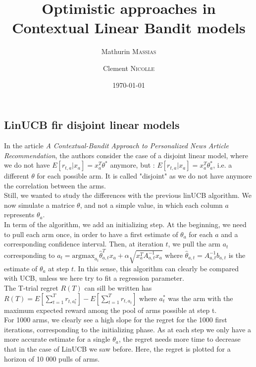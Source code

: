 \documentclass[11pt,a4paper]{article}
\begin{document}
	\title{Optimistic approaches in Contextual Linear Bandit models}
	\author{Mathurin \textsc{Massias} \and Clement \textsc{Nicolle}}
	\date{\today} 
	\maketitle
	
\subsection{LinUCB fir disjoint linear models}	

In the article \textit{A Contextual-Bandit Approach to Personalized News Article Recommendation}, the authors consider the case of a disjoint linear model, where we do not have $E[r_{t,a}|x_a] = x_{a}^T \theta^{*}$ anymore, but : $E[r_{t,a}|x_a] = x_{a}^T \theta_a^{*}$, i.e. a different $\theta$ for each possible arm. It is called "disjoint" as we do not have anymore the correlation between the arms.\\

Still, we wanted to study the differences with the previous linUCB algorithm. We now simulate a matrice $\theta$, and not a simple value, in which each column $a$ represents $\theta_a$.\\
In term of the algorithm, we add an initializing step. At the beginning, we need to pull each arm once, in order to have a first estimate of $\theta_a$ for each $a$ and a corresponding confidence interval.
Then, at iteration $t$, we pull the arm $a_t$ corresponding to $a_t = \mathrm{argmax}_{a_t} \widehat{\theta}_{a,t}^{T} x_a + \alpha \sqrt{x_a^T A_{a,t}^{-1} x_a}$ where $\widehat{\theta}_{a,t} = A_{a,t}^{-1}b_{a,t}$ is the estimate of $\theta_a$ at step $t$. In this sense, this algorithm can clearly be compared with UCB, unless we here try to fit a regression parameter.\\

The T-trial regret $R(T)$ can sill be written has $R(T) = E[\sum_{t=1}^{T} r_{t,a_t^{*}}] -  E[\sum_{t=1}^{T} r_{t,a_t}]$ where $a_t^{*}$ was the arm with the maximum expected reward among the pool of arms possible at step t.\\

For 1000 arms, we clearly see a high slope for the regret for the 1000 first iterations, corresponding to the initializing phase. As at each step we only have a more accurate estimate for a single $\theta_a$, the regret needs more time to decrease that in the case of LinUCB we saw before. Here, the regret is plotted for a horizon of 10 000 pulls of arms.
\end{document}
